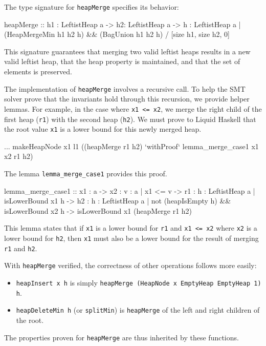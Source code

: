 The type signature for \texttt{heapMerge} specifies its behavior:
\begin{code}
  heapMerge :: h1 : LeftistHeap a 
        -> h2: LeftistHeap a 
        -> {h : LeftistHeap a | (HeapMergeMin h1 h2 h) 
                             && (BagUnion h1 h2 h)}
        / [size h1, size h2, 0]
\end{code}
This signature guarantees that merging two valid leftist heaps results in a new valid leftist heap, that the heap property is maintained, and that the set of elements is preserved.

The implementation of \texttt{heapMerge} involves a recursive call. To help the SMT solver prove that the invariants hold through this recursion, we provide helper lemmas. For example, in the case where \texttt{x1 <= x2}, we merge the right child of the first heap (\texttt{r1}) with the second heap (\texttt{h2}). We must prove to Liquid Haskell that the root value \texttt{x1} is a lower bound for this newly merged heap.
\begin{code}
... makeHeapNode x1 l1 ((heapMerge r1 h2) 
    `withProof` lemma_merge_case1 x1 x2 r1 h2)
\end{code}
The lemma \texttt{lemma\_merge\_case1} provides this proof.
\begin{code}
  lemma_merge_case1 :: x1 : a  
        -> x2 : { v : a |  x1  <= v}
        -> r1 : {h : LeftistHeap a | isLowerBound x1 h} 
        -> h2 : {h : LeftistHeap a | not (heapIsEmpty h) 
                                  && isLowerBound x2 h}  
        -> {isLowerBound x1 (heapMerge r1 h2)}
\end{code}
This lemma states that if \texttt{x1} is a lower bound for \texttt{r1} and \texttt{x1 <= x2} where \texttt{x2} is a lower bound for \texttt{h2}, then \texttt{x1} must also be a lower bound for the result of merging \texttt{r1} and \texttt{h2}.

With \texttt{heapMerge} verified, the correctness of other operations follows more easily:
\begin{itemize}
	\item \texttt{heapInsert x h} is simply \texttt{heapMerge (HeapNode x EmptyHeap EmptyHeap 1) h}.
	\item \texttt{heapDeleteMin h} (or \texttt{splitMin}) is \texttt{heapMerge} of the left and right children of the root.
\end{itemize}
The properties proven for \texttt{heapMerge} are thus inherited by these functions.

